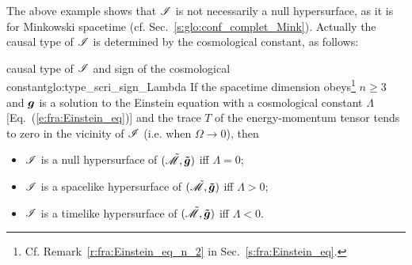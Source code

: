 The above example shows that $\mathscr{I}$ is not necessarily a null hypersurface,
as it is for Minkowski spacetime (cf. Sec.~\ref{s:glo:conf_complet_Mink}).
Actually the causal type of $\mathscr{I}$ is determined by the cosmological
constant, as follows:
\begin{tprop}{causal type of $\mathscr{I}$ and sign of the cosmological constant}{glo:type_scri_sign_Lambda}
If the spacetime dimension obeys\footnote{Cf. Remark~\ref{r:fra:Einstein_eq_n_2} in
Sec.~\ref{s:fra:Einstein_eq}.}
$n\geq 3$ and $\bm{g}$ is a solution to the Einstein equation with
a cosmological constant $\Lambda$ [Eq.~(\ref{e:fra:Einstein_eq})]
and the trace $T$ of the energy-momentum tensor tends to zero in the
vicinity of $\mathscr{I}$ (i.e. when $\Omega\rightarrow 0$), then
\begin{itemize}
\item $\mathscr{I}$ is a null hypersurface of $(\tilde{\mathscr{M}},\bm{\tilde{g}})$ iff $\Lambda=0$;
\item $\mathscr{I}$ is a spacelike hypersurface of $(\tilde{\mathscr{M}},\bm{\tilde{g}})$ iff $\Lambda>0$;
\item $\mathscr{I}$ is a timelike hypersurface of $(\tilde{\mathscr{M}},\bm{\tilde{g}})$ iff $\Lambda<0$.
\end{itemize}
\end{tprop}

